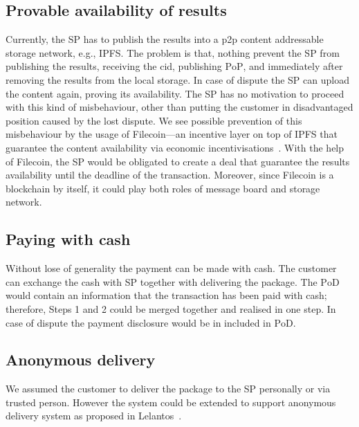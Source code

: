 \documentclass{ieeeaccess}
\begin{document}
\subsection{Provable availability of
results}\label{cryptographically-provable-availability-of-results}

Currently, the SP has to publish the results into a p2p content addressable storage network, e.g., IPFS. The problem is that, nothing prevent the SP from publishing the results, receiving the cid, publishing $\mathrm{PoP}$, and immediately after removing the results from the local storage. In case of dispute the SP can upload the content again, proving its availability. The SP has no motivation to proceed with this kind of misbehaviour, other than putting the customer in disadvantaged position caused by the lost dispute. We see possible prevention of this misbehaviour by the usage of Filecoin---an incentive layer on top of IPFS that guarantee the content availability via economic incentivisations~\cite{benetfilecoin}. With the help of Filecoin, the SP would be obligated to create a deal that guarantee the results availability until the deadline of the transaction. Moreover, since Filecoin is a blockchain by itself, it could play both roles of message board and storage network.

\subsection{Paying with cash}\label{paying-with-cash}

Without lose of generality the payment can be made with cash. The customer can exchange the cash with SP together with delivering the package. The $\mathrm{PoD}$ would contain an information that the transaction has been paid with cash; therefore, Steps 1 and 2 could be merged together and realised in one step. In case of dispute the payment disclosure would be in included in $\mathrm{PoD}$.

\subsection{Anonymous delivery}\label{anonymous-delivery}

We assumed the customer to deliver the package to the SP personally or via trusted person. However the system could be extended to support anonymous delivery system as proposed in Lelantos~\cite{altawy2017lelantos}.
\end{document}

